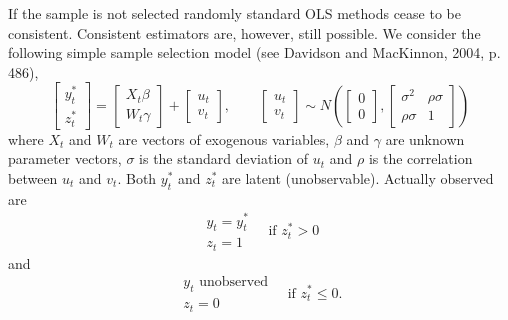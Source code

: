 \documentclass{article}
\begin{document}
If the sample is not selected randomly standard OLS methods cease to be
consistent. Consistent estimators are, however, still possible. We consider
the following simple sample selection model (see Davidson and MacKinnon,
2004, p. 486),%
\begin{equation*}
\left[
\begin{array}{c}
y_{t}^{\ast } \\
z_{t}^{\ast }%
\end{array}%
\right] =\left[
\begin{array}{c}
X_{t}\beta \\
W_{t}\gamma%
\end{array}%
\right] +\left[
\begin{array}{c}
u_{t} \\
v_{t}%
\end{array}%
\right] ,\qquad \left[
\begin{array}{c}
u_{t} \\
v_{t}%
\end{array}%
\right] \sim N\left( \left[
\begin{array}{c}
0 \\
0%
\end{array}%
\right] ,\left[
\begin{array}{cc}
\sigma ^{2} & \rho \sigma \\
\rho \sigma & 1%
\end{array}%
\right] \right)
\end{equation*}%
where $X_{t}$ and $W_{t}$ are vectors of exogenous variables, $\beta $ and $%
\gamma $ are unknown parameter vectors, $\sigma $ is the standard deviation
of $u_{t}$ and $\rho $ is the correlation between $u_{t}$ and $v_{t}$. Both $%
y_{t}^{\ast }$ and $z_{t}^{\ast }$ are latent (unobservable). Actually
observed are%
\begin{equation*}
\begin{array}{l}
y_{t}=y_{t}^{\ast } \\
z_{t}=1%
\end{array}%
\quad \text{if }z_{t}^{\ast }>0
\end{equation*}%
and%
\begin{equation*}
\begin{array}{l}
y_{t}\text{ unobserved} \\
z_{t}=0%
\end{array}%
\quad \text{if }z_{t}^{\ast }\leq 0.
\end{equation*}
\end{document}
